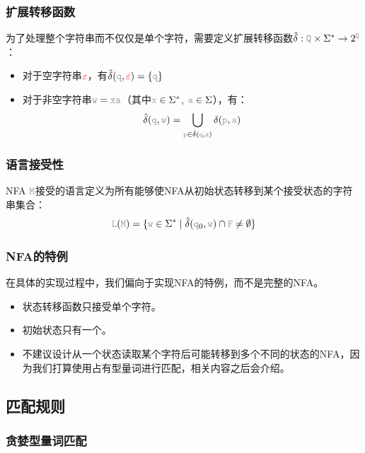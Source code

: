 \documentclass[12pt,a4paper,UTF8]{ctexart}
\newcommand{\var}[1]{\textcolor{lightgray}{\mathtt{#1}}}
\newcommand{\func}[1]{\textcolor{red}{#1}}
\begin{document}
\subsubsection{扩展转移函数}

\qquad 为了处理整个字符串而不仅仅是单个字符，需要定义扩展转移函数$\hat{\delta}: \var{Q} \times \Sigma^* \rightarrow 2^{\var{Q}}$：
\begin{itemize}
    \item 对于空字符串$\func{\varepsilon}$，有$\hat{\delta}(\var{q}, \func{\varepsilon}) = \{\var{q}\}$
    \item 对于非空字符串$\var{w} = \var{xa}$（其中$\var{x} \in \Sigma^*$, $\var{a} \in \Sigma$），有：
    \[\hat{\delta}(\var{q}, \var{w}) = \bigcup_{\var{p} \in \hat{\delta}(\var{q}, \var{x})} \delta(\var{p}, \var{a})\]
\end{itemize}

\subsubsection{语言接受性}

\qquad NFA $\var{M}$接受的语言定义为所有能够使NFA从初始状态转移到某个接受状态的字符串集合：
\[\var{L}(\var{M}) = \{\var{w} \in \Sigma^* \mid \hat{\delta}(\var{q}_0, \var{w}) \cap \var{F} \ne \emptyset\}\]

\subsubsection*{NFA的特例}

\qquad 在具体的实现过程中，我们偏向于实现NFA的特例，而不是完整的NFA。
\begin{itemize}
    \item 状态转移函数只接受单个字符。
    \item 初始状态只有一个。
    \item 不建议设计从一个状态读取某个字符后可能转移到多个不同的状态的NFA，因为我们打算使用占有型量词进行匹配，相关内容之后会介绍。
\end{itemize}

\subsection{匹配规则}

\subsubsection{贪婪型量词匹配}
\end{document}
